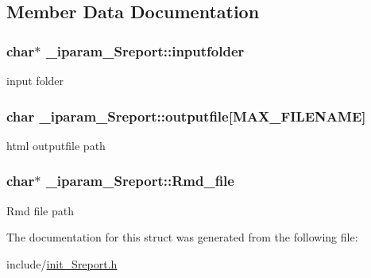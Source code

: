 \subsection{Member Data Documentation}
\hypertarget{struct__iparam__Sreport_af5521a185f440566547b4b11b9fac6a4}{
\subsubsection[{inputfolder}]{\setlength{\rightskip}{0pt plus 5cm}char$\ast$ \+\_\+iparam\+\_\+\+Sreport\+::inputfolder}}\label{struct__iparam__Sreport_af5521a185f440566547b4b11b9fac6a4}
input folder \hypertarget{struct__iparam__Sreport_aab71d9b5647daf65a8ba9ba6f7a35ee5}{
\subsubsection[{outputfile}]{\setlength{\rightskip}{0pt plus 5cm}char \+\_\+iparam\+\_\+\+Sreport\+::outputfile\mbox{[}{\bf M\+A\+X\+\_\+\+F\+I\+L\+E\+N\+A\+M\+E}\mbox{]}}}\label{struct__iparam__Sreport_aab71d9b5647daf65a8ba9ba6f7a35ee5}
html outputfile path \hypertarget{struct__iparam__Sreport_a8a234e0192ac0cb671c75ea16a545fa1}{
\subsubsection[{Rmd\+\_\+file}]{\setlength{\rightskip}{0pt plus 5cm}char$\ast$ \+\_\+iparam\+\_\+\+Sreport\+::\+Rmd\+\_\+file}}\label{struct__iparam__Sreport_a8a234e0192ac0cb671c75ea16a545fa1}
Rmd file path 

The documentation for this struct was generated from the following file\+:\begin{DoxyCompactItemize}
\item 
include/\hyperlink{init__Sreport_8h}{init\+\_\+\+Sreport.\+h}\end{DoxyCompactItemize}
